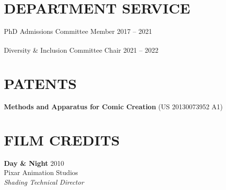 \documentclass[line,margin]{res}
\begin{document}
\begin{resume}
\section{DEPARTMENT SERVICE}

PhD Admissions Committee Member \hfill 2017 -- 2021
\\ \\
Diversity \& Inclusion Committee Chair \hfill 2021 -- 2022








\section{PATENTS}

\newcommand{\patent}[2] {
	\textbf{#1} (#2)
}

\patent
{Methods and Apparatus for Comic Creation}
{US 20130073952 A1}


\section{FILM CREDITS}

\newcommand{\filmcred}[4] {
	\textbf{#1} \hfill #2
	\\
	#3
	\\
	\emph{#4}
}

\filmcred
{Day \& Night}
{2010}
{Pixar Animation Studios}
{Shading Technical Director}


\end{resume}
\end{document}
